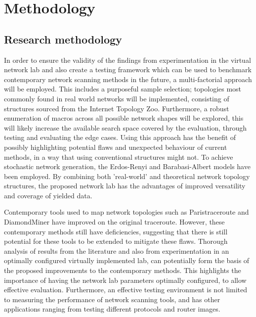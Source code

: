 \section{Methodology}

\subsection{Research methodology}

 In order to ensure the validity of the findings from experimentation in the virtual network lab and also create a testing framework which can be used to benchmark contemporary network scanning methods in the future, a multi-factorial approach will be employed. This includes a purposeful sample selection; topologies most commonly found in real world networks will be implemented, consisting of structures sourced from the Internet Topology Zoo\cite{topology_zoo}. Furthermore, a robust enumeration of macros across all possible network shapes will be explored, this will likely increase the available search space covered by the evaluation, through testing and evaluating the edge cases. Using this approach has the benefit of possibly highlighting potential flaws and unexpected behaviour of current methods, in a way that using conventional structures might not. To achieve stochastic network generation, the Erdos-Renyi and Barabasi-Albert models have been employed. By combining both  'real-world' and theoretical network topology structures, the proposed network lab has the advantages of improved versatility and coverage of yielded data.  

Contemporary tools used to map network topologies such as Paristraceroute\cite{anomalies} and DiamondMiner\cite{diamond-miner} have improved on the original traceroute. However, these contemporary methods still have deficiencies, suggesting that there is still potential for these tools to be extended to mitigate these flaws. Thorough analysis of results from the literature and also from experimentation in an optimally configured virtually implemented lab, can potentially form the basis of the proposed improvements to the contemporary methods. This highlights the importance of having the network lab parameters optimally configured, to allow effective evaluation. Furthermore, an effective testing environment is not limited to measuring the performance of network scanning tools, and has other applications ranging from testing different protocols and router images. 

